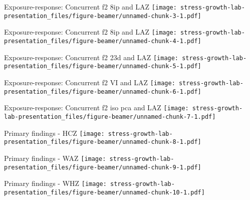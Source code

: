 \documentclass[
  ignorenonframetext,
]{beamer}
\begin{document}
\begin{frame}{Exposure-response: Concurrent f2 8ip and LAZ}
\protect\hypertarget{exposure-response-concurrent-f2-8ip-and-laz}{}
\texttt{[image: stress-growth-lab-presentation\_files/figure-beamer/unnamed-chunk-3-1.pdf]}
\end{frame}

\begin{frame}{Exposure-response: Concurrent f2 8ip and LAZ}
\protect\hypertarget{exposure-response-concurrent-f2-8ip-and-laz-1}{}
\texttt{[image: stress-growth-lab-presentation\_files/figure-beamer/unnamed-chunk-4-1.pdf]}
\end{frame}

\begin{frame}{Exposure-response: Concurrent f2 23d and LAZ}
\protect\hypertarget{exposure-response-concurrent-f2-23d-and-laz}{}
\texttt{[image: stress-growth-lab-presentation\_files/figure-beamer/unnamed-chunk-5-1.pdf]}
\end{frame}

\begin{frame}{Exposure-response: Concurrent f2 VI and LAZ}
\protect\hypertarget{exposure-response-concurrent-f2-vi-and-laz}{}
\texttt{[image: stress-growth-lab-presentation\_files/figure-beamer/unnamed-chunk-6-1.pdf]}
\end{frame}

\begin{frame}{Exposure-response: Concurrent f2 iso pca and LAZ}
\protect\hypertarget{exposure-response-concurrent-f2-iso-pca-and-laz}{}
\texttt{[image: stress-growth-lab-presentation\_files/figure-beamer/unnamed-chunk-7-1.pdf]}
\end{frame}

\begin{frame}{Primary findings - HCZ}
\protect\hypertarget{primary-findings---hcz}{}
\texttt{[image: stress-growth-lab-presentation\_files/figure-beamer/unnamed-chunk-8-1.pdf]}
\end{frame}

\begin{frame}{Primary findings - WAZ}
\protect\hypertarget{primary-findings---waz}{}
\texttt{[image: stress-growth-lab-presentation\_files/figure-beamer/unnamed-chunk-9-1.pdf]}
\end{frame}

\begin{frame}{Primary findings - WHZ}
\protect\hypertarget{primary-findings---whz}{}
\texttt{[image: stress-growth-lab-presentation\_files/figure-beamer/unnamed-chunk-10-1.pdf]}
\end{frame}
\end{document}
